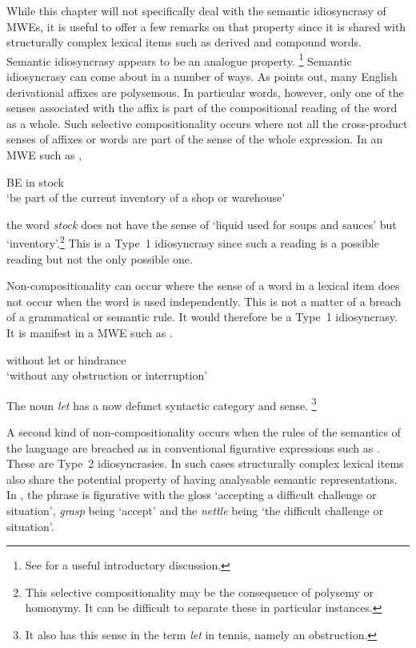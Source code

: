 \documentclass[output=paper]{langsci/langscibook}
\begin{document}
\bigskip
While this chapter will not specifically deal with the semantic idiosyncrasy of MWEs, it is useful to offer a few remarks on that property since it is shared with structurally complex lexical items such as derived and compound words. Semantic idiosyncrasy appears to be an analogue 
property.%
\footnote{See \citet{Burger2010} for a useful introductory discussion.} 
%
Semantic idiosyncrasy can come about in a number of ways. As 
\citet{Jackendoff1975} points out, many  English derivational affixes are 
polysemous. In particular words, however, only one of the senses 
associated with the affix is part of the compositional reading of the word 
as a whole. Such selective compositionality occurs where not all the 
cross-product senses of affixes or words are part of the sense of the 
whole expression. In an MWE such as ,

\begin{exe}
\ex\label{ex:ex22}    BE in stock\\
  ‘be part of the current inventory of a shop or warehouse’
\end{exe}

\noindent
the word \textit{stock} does not have the sense of ‘liquid used for soups and sauces’ but  ‘inventory’.\footnote{   This selective compositionality may be the consequence of polysemy or homonymy. It can be difficult to separate these in particular instances.} This is a Type~1 idiosyncrasy since such a reading is a possible reading but not the only possible one.

Non-compositionality can occur where the sense of a word in a lexical item 
does not occur when the word is used independently. This is not a matter 
of a breach of a grammatical or semantic rule. It would therefore be a 
Type~1 idiosyncrasy. It is manifest in a MWE such as .

\begin{exe}
\ex\label{ex:ex23}     without let or hindrance\\
‘without any obstruction or interruption’
\end{exe}

\noindent
The noun \textit{let} has a now defunct syntactic category and sense.%
\footnote{It also has this sense in the term \textit{let} in tennis, namely an obstruction.}

A second kind of non-compositionality occurs when the rules of the semantics of the language are breached as in conventional figurative expressions such as . These are Type~2 idiosyncrasies. In such cases structurally complex lexical items also share the potential property of having analysable semantic representations. In , the phrase is figurative with the gloss ‘accepting a difficult challenge or situation’, \textit{grasp} being ‘accept’ and the \textit{nettle} being ‘the difficult challenge or situation’.
\end{document}
